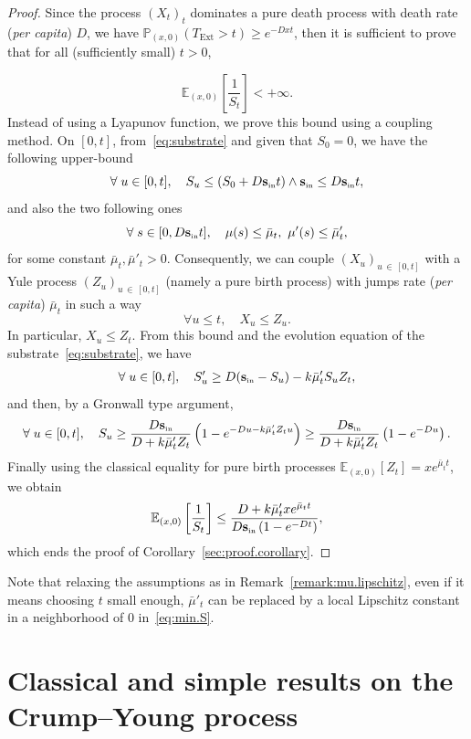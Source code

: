 \documentclass[AHL,Unicode,longabstracts,published]{cedram}
\newcommand{\PP}{\mathbb{P}}
\newcommand{\EE}{\mathbb{E}}
\newcommand{\Sin}{{\mathbf s}_{\textrm{\tiny\rm in}}}
\newcommand{\Text}{T_{\mathrm{Ext}}}
\newcommand{\1}{\mathbf{1}}
\let\oldforall\forall
\renewcommand*{\forall}{\mathrel{\oldforall}}
\begin{document}
\begin{proof}
Since the process $(X_t)_t$ dominates a pure death process with death rate (\emph{per capita}) $D$, we have $\PP_{(x,0)}(\Text > t) \geq e^{-D x t}$, then it is sufficient to prove that for all (sufficiently small) $t>0$,

\[
\EE_{(x,0)}\left[\frac{1}{S_t} \right] <+\infty.
\]
Instead of using a Lyapunov function, we prove this bound using a coupling method. On $[0,t]$, from~\eqref{eq:substrate} and given that $S_0=0$, we have the following upper-bound
\[
\forall u\in [0,t], \quad S_u \leq (S_0 + D\Sin t)\wedge \Sin \leq D\Sin t,
\]
and also the two following ones
\[
\forall s\in[0,D\Sin t], \quad \mu(s) \leq \bar\mu_t, \ \mu'(s) \leq \bar\mu'_t,
\]
for some constant $\bar\mu_t, \bar\mu'_t>0$. Consequently, we can couple $(X_u)_{u\,\in\,[0,t]}$ with a Yule process $(Z_u)_{u\,\in \,[0,t]}$ (namely a pure birth process) with jumps rate (\emph{per capita}) $\bar\mu_t$ in such a way
\[
\forall u\leq t, \quad X_u \leq Z_u.
\]
In particular, $X_u\leq Z_t$. From this bound and the evolution equation of the substrate~\eqref{eq:substrate}, we have
\begin{align}\label{eq:min.S}
\forall u\in [0,t], \quad S_u' \geq D(\Sin -S_u) - k \bar\mu'_t S_u Z_t,
\end{align}
and then, by a Gronwall type argument,
\[
\forall u\in [0,t], \quad S_u \geq \frac{D \Sin}{D+ k \bar\mu'_t Z_t } \left(1-e^{-D u- k \bar\mu'_t Z_t u}\right) \geq \frac{D \Sin}{D+ k \bar\mu'_tZ_t } \left(1-e^{-D u}\right).
\]
Finally using the classical equality for pure birth processes $\EE_{(x,0)}[Z_t] = x e^{\bar\mu_t t}$, we obtain
\[
\EE_{(x,0)}\left[\frac{1}{S_t} \right] \leq \frac{D+ k \bar\mu'_t x e^{\bar\mu_t t} }{D \Sin \left(1-e^{-D t}\right)},
\]
which ends the proof of Corollary~\ref{sec:proof.corollary}.
\end{proof}

Note that relaxing the assumptions as in Remark~\ref{remark:mu.lipschitz}, even if it means choosing $t$ small enough, $\bar{\mu}'_t$ can be replaced by a local Lipschitz constant in a neighborhood of $0$ in~\eqref{eq:min.S}.



\appendix



\section{Classical and simple results on the Crump--Young process}
\end{document}
